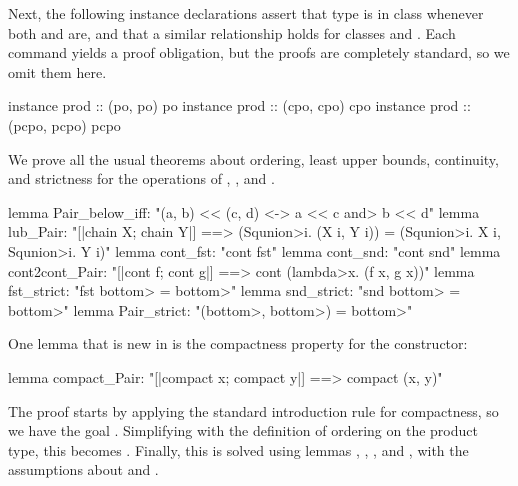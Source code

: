 \noindent
Next, the following instance declarations assert that type  is in class  whenever both  and  are, and that a similar relationship holds for classes  and . Each  command yields a proof obligation, but the proofs are completely standard, so we omit them here.

\begin{isacodes}
instance prod :: (po, po) po
instance prod :: (cpo, cpo) cpo
instance prod :: (pcpo, pcpo) pcpo
\end{isacodes}

\noindent
We prove all the usual theorems about ordering, least upper bounds, continuity, and strictness for the operations of , , and .

\begin{isacodes}
lemma Pair_below_iff: "(a, b) << (c, d) <-> a << c \<and> b << d"
lemma lub_Pair: "[|chain X; chain Y|] ==> (\<Squnion>i. (X i, Y i)) = (\<Squnion>i. X i, \<Squnion>i. Y i)"
lemma cont_fst: "cont fst"
lemma cont_snd: "cont snd"
lemma cont2cont_Pair: "[|cont f; cont g|] ==> cont (\<lambda>x. (f x, g x))"
lemma fst_strict: "fst \<bottom> = \<bottom>"
lemma snd_strict: "snd \<bottom> = \<bottom>"
lemma Pair_strict: "(\<bottom>, \<bottom>) = \<bottom>"
\end{isacodes}

\noindent
One lemma that is new in  is the compactness property for the  constructor:

\begin{isacode}
lemma compact_Pair: "[|compact x; compact y|] ==> compact (x, y)"
\end{isacode}

\noindent
The proof starts by applying the standard introduction rule for compactness, so we have the goal . Simplifying with the definition of ordering on the product type, this becomes . Finally, this is solved using lemmas , , , and , with the assumptions about  and .



